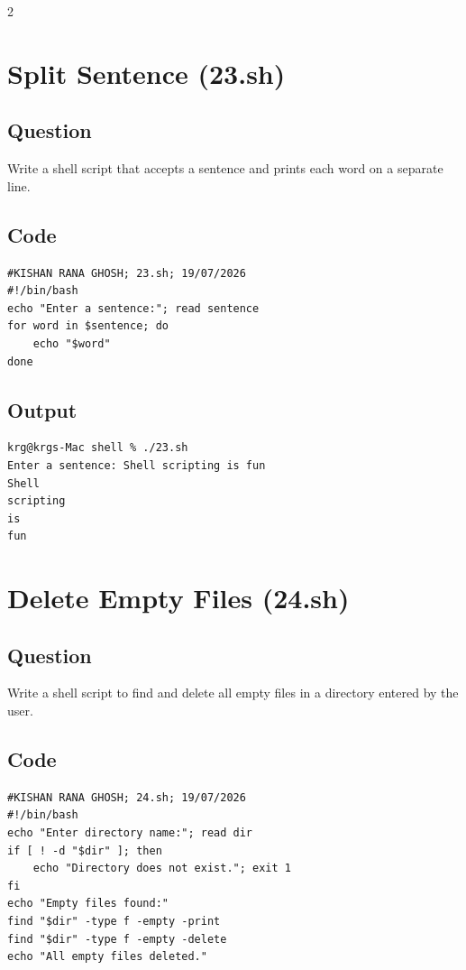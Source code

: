 \documentclass[a4paper,12pt]{article}
\begin{document}
\begin{multicols}{2}

\section{Split Sentence (23.sh)}
\subsection*{Question}
Write a shell script that accepts a sentence and prints each word on a separate line.

\subsection*{Code}
\begin{lstlisting}[style=bashstyle]
#KISHAN RANA GHOSH; 23.sh; 19/07/2026
#!/bin/bash
echo "Enter a sentence:"; read sentence
for word in $sentence; do
    echo "$word"
done
\end{lstlisting}

\subsection*{Output}
\begin{lstlisting}[style=outputstyle]
krg@krgs-Mac shell % ./23.sh
Enter a sentence: Shell scripting is fun
Shell
scripting
is
fun
\end{lstlisting}

\columnbreak

\section{Delete Empty Files (24.sh)}
\subsection*{Question}
Write a shell script to find and delete all empty files in a directory entered by the user.

\subsection*{Code}
\begin{lstlisting}[style=bashstyle]
#KISHAN RANA GHOSH; 24.sh; 19/07/2026
#!/bin/bash
echo "Enter directory name:"; read dir
if [ ! -d "$dir" ]; then
    echo "Directory does not exist."; exit 1
fi
echo "Empty files found:"
find "$dir" -type f -empty -print
find "$dir" -type f -empty -delete
echo "All empty files deleted."
\end{lstlisting}


\end{multicols}
\end{document}
